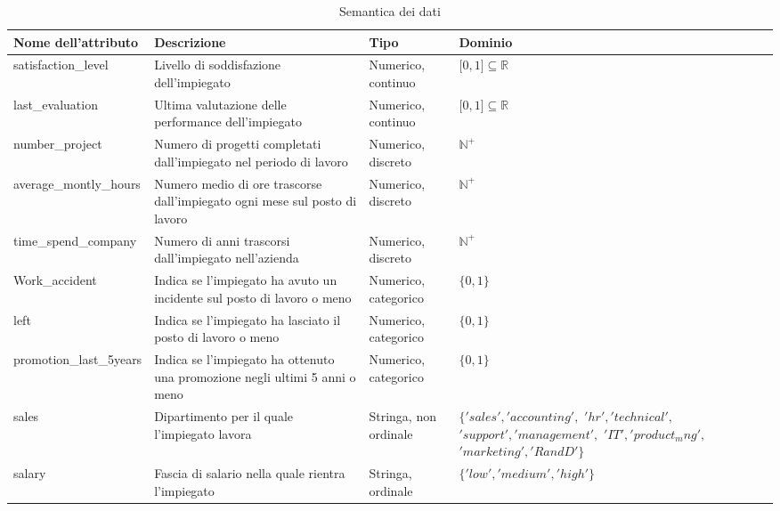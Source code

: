 \documentclass[a4paper]{article}
\begin{document}
\begin{table}[h]
\centering


\begingroup
\setlength{\tabcolsep}{8pt} %
\renewcommand{\arraystretch}{1.4} %
\begin{tabularx}{\textwidth}{|lXlX|}
\hline
\textbf{Nome dell'attributo} & \textbf{Descrizione}                                                              & \textbf{Tipo} & Dominio\\\hline
satisfaction\_level          & Livello di soddisfazione dell'impiegato  & Numerico, continuo  & ${[}0,1{]}\subseteq\mathbb{R}$  \\ 
last\_evaluation             & Ultima valutazione delle performance dell'impiegato                                   & Numerico, continuo  & ${[}0,1{]}\subseteq\mathbb{R}$\\ 
number\_project              & Numero di progetti completati dall'impiegato nel periodo di lavoro                               & Numerico, discreto  & $\mathbb{N^+}$  \\ 
average\_montly\_hours       & Numero medio di ore trascorse dall'impiegato ogni mese sul posto di lavoro                       & Numerico, discreto   & $\mathbb{N^+}$   \\ 
time\_spend\_company         & Numero di anni trascorsi dall'impiegato nell'azienda                                             & Numerico, discreto   & $\mathbb{N^+}$   \\ 
Work\_accident               & Indica se l'impiegato ha avuto un incidente sul posto di lavoro o meno                                         & Numerico, categorico   & $ \{ 0, 1 \}$   \\ 
left                         & Indica se l'impiegato ha lasciato il posto di lavoro o meno                       & Numerico, categorico   & $ \{ 0, 1 \}$   \\ 
promotion\_last\_5years      & Indica se l'impiegato ha ottenuto una promozione negli ultimi 5 anni o meno     & Numerico, categorico   & $ \{ 0, 1 \}$   \\ 
sales                        & Dipartimento per il quale l'impiegato lavora                                      & Stringa, non ordinale   & $ \{'sales','accounting',$\newline
$'hr','technical',$\newline
$'support','management',$\newline
$'IT','product_mng',$\newline
$'marketing','RandD'\}$    \\ 
salary                       & Fascia di salario nella quale rientra l'impiegato     & Stringa, ordinale    & $ \{ 'low', 'medium', 'high' \}$   \\ \hline
\end{tabularx}
\endgroup
\caption{Semantica dei dati}
\label{tab:semantics}
\end{table}
\end{document}
